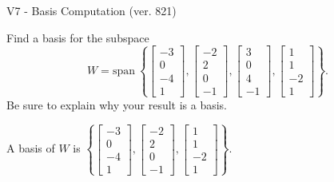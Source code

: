 \begin{exercise}
  \begin{exerciseTitle}V7 - Basis Computation (ver. 821)\end{exerciseTitle}
  \begin{exerciseStatement}
    Find a basis for the subspace 
\[W=\mathrm{span}\ \left\{\left[\begin{array}{r}
-3 \\
0 \\
-4 \\
1
\end{array}\right] , \left[\begin{array}{r}
-2 \\
2 \\
0 \\
-1
\end{array}\right] , \left[\begin{array}{r}
3 \\
0 \\
4 \\
-1
\end{array}\right] , \left[\begin{array}{r}
1 \\
1 \\
-2 \\
1
\end{array}\right]\right\}.\]
 Be sure to explain why your result is a basis.


  \end{exerciseStatement}
  \begin{exerciseAnswer}
   A basis of \(W\) is  \(\left\{\left[\begin{array}{r}
-3 \\
0 \\
-4 \\
1
\end{array}\right] , \left[\begin{array}{r}
-2 \\
2 \\
0 \\
-1
\end{array}\right] , \left[\begin{array}{r}
1 \\
1 \\
-2 \\
1
\end{array}\right]\right\}\).
  


  \end{exerciseAnswer}
\end{exercise}